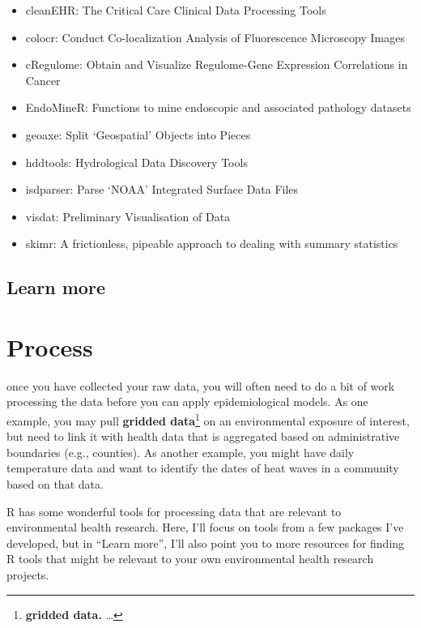 \documentclass[]{tufte-book}
\providecommand{\tightlist}{%
  \setlength{\itemsep}{0pt}\setlength{\parskip}{0pt}}
\begin{document}
\begin{itemize}
\tightlist
\item
  cleanEHR: The Critical Care Clinical Data Processing Tools
\item
  colocr: Conduct Co-localization Analysis of Fluorescence Microscopy Images
\item
  cRegulome: Obtain and Visualize Regulome-Gene Expression Correlations in Cancer
\item
  EndoMineR: Functions to mine endoscopic and associated pathology datasets
\item
  geoaxe: Split `Geospatial' Objects into Pieces
\item
  hddtools: Hydrological Data Discovery Tools
\item
  isdparser: Parse `NOAA' Integrated Surface Data Files
\item
  visdat: Preliminary Visualisation of Data
\item
  skimr: A frictionless, pipeable approach to dealing with summary statistics
\end{itemize}

\hypertarget{learn-more-3}{%
\section{Learn more}\label{learn-more-3}}

\hypertarget{process}{%
\chapter{Process}\label{process}}

 once you have collected your raw data,
you will often need to do a bit of work processing the data before you can apply epidemiological
models. As one example, you may pull \textbf{gridded data}\footnote{\textbf{gridded data.} \ldots{}} on an
environmental exposure of interest, but need to link it with health data that is aggregated
based on administrative boundaries (e.g., counties). As another example, you might have
daily temperature data and want to identify the dates of heat waves in a community based on
that data.

R has some wonderful tools for processing data that are relevant to environmental health research.
Here, I'll focus on tools from a few packages I've developed, but in ``Learn more'', I'll also
point you to more resources for finding R tools that might be relevant to your own environmental
health research projects.
\end{document}
